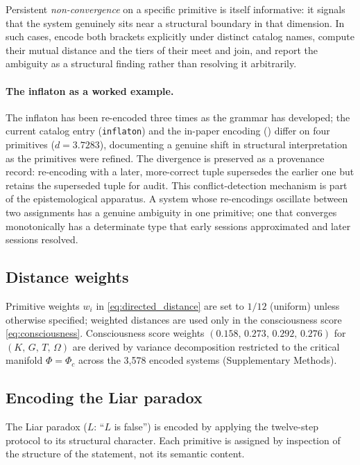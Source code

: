 \documentclass[12pt,a4paper]{article}
\newcommand{\Phic}{\Phi_c}
\begin{document}
Persistent \emph{non-convergence} on a specific primitive is itself
informative: it signals that the system genuinely sits near a
structural boundary in that dimension. In such cases, encode both
brackets explicitly under distinct catalog names, compute their
mutual distance and the tiers of their meet and join, and report
the ambiguity as a structural finding rather than resolving it
arbitrarily.

\paragraph{The inflaton as a worked example.}
The inflaton has been re-encoded three times as the grammar has
developed; the current catalog entry (\texttt{inflaton}) and the
in-paper encoding () differ on four primitives
($d = 3.7283$), documenting a genuine shift in structural
interpretation as the primitives were refined. The divergence is
preserved as a provenance record: re-encoding with a later,
more-correct tuple supersedes the earlier one but retains the
superseded tuple for audit. This conflict-detection mechanism is
part of the epistemological apparatus. A system whose re-encodings
oscillate between two assignments has a genuine ambiguity in one
primitive; one that converges monotonically has a determinate type
that early sessions approximated and later sessions resolved.

\subsection{Distance weights}

Primitive weights $w_i$ in \eqref{eq:directed_distance} are set to
$1/12$ (uniform) unless otherwise specified; weighted distances are
used only in the consciousness score \eqref{eq:consciousness}.
Consciousness score weights $(0.158,\, 0.273,\, 0.292,\, 0.276)$ for
$(K,\, G,\, T,\, \Omega)$ are derived by variance decomposition
restricted to the critical manifold $\Phi = \Phic$ across the 3,578
encoded systems (Supplementary Methods).

\subsection{Encoding the Liar paradox}
\label{sec:encoding_liar}

The Liar paradox ($L$: ``$L$ is false'') is encoded by applying the
twelve-step protocol to its structural character. Each primitive is
assigned by inspection of the structure of the statement, not its
semantic content.
\end{document}
